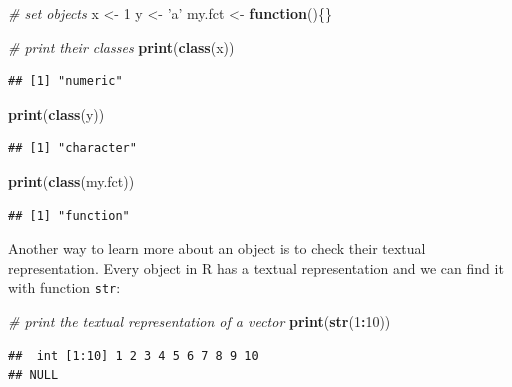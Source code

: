 \documentclass[11pt,]{book}
\newenvironment{Shaded}{\begin{snugshade}}{\end{snugshade}}
\newcommand{\KeywordTok}[1]{\textcolor[rgb]{0.27,0.27,0.27}{\textbf{#1}}}
\newcommand{\DecValTok}[1]{\textcolor[rgb]{0.06,0.06,0.06}{#1}}
\newcommand{\StringTok}[1]{\textcolor[rgb]{0.5,0.5,0.5}{#1}}
\newcommand{\CommentTok}[1]{\textcolor[rgb]{0.56,0.35,0.01}{\textit{#1}}}
\newcommand{\ControlFlowTok}[1]{\textcolor[rgb]{0.13,0.29,0.53}{\textbf{#1}}}
\newcommand{\OperatorTok}[1]{\textcolor[rgb]{0.81,0.36,0.00}{\textbf{#1}}}
\newcommand{\NormalTok}[1]{#1}
\begin{document}
\begin{Shaded}
\begin{Highlighting}[]
\CommentTok{# set objects}
\NormalTok{x <-}\StringTok{ }\DecValTok{1}
\NormalTok{y <-}\StringTok{ 'a'}
\NormalTok{my.fct <-}\StringTok{ }\ControlFlowTok{function}\NormalTok{()\{\}}

\CommentTok{# print their classes}
\KeywordTok{print}\NormalTok{(}\KeywordTok{class}\NormalTok{(x))}
\end{Highlighting}
\end{Shaded}

\begin{verbatim}
## [1] "numeric"
\end{verbatim}

\begin{Shaded}
\begin{Highlighting}[]
\KeywordTok{print}\NormalTok{(}\KeywordTok{class}\NormalTok{(y))}
\end{Highlighting}
\end{Shaded}

\begin{verbatim}
## [1] "character"
\end{verbatim}

\begin{Shaded}
\begin{Highlighting}[]
\KeywordTok{print}\NormalTok{(}\KeywordTok{class}\NormalTok{(my.fct))}
\end{Highlighting}
\end{Shaded}

\begin{verbatim}
## [1] "function"
\end{verbatim}

Another way to learn more about an object is to check their textual
representation. Every object in R has a textual representation and we
can find it with function \texttt{str}: 

\begin{Shaded}
\begin{Highlighting}[]
\CommentTok{# print the textual representation of a vector}
\KeywordTok{print}\NormalTok{(}\KeywordTok{str}\NormalTok{(}\DecValTok{1}\OperatorTok{:}\DecValTok{10}\NormalTok{))}
\end{Highlighting}
\end{Shaded}

\begin{verbatim}
##  int [1:10] 1 2 3 4 5 6 7 8 9 10
## NULL
\end{verbatim}
\end{document}
